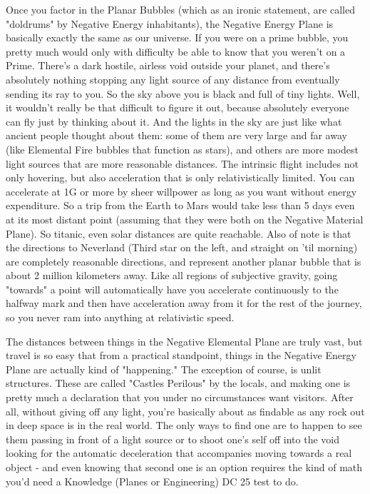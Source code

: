Once you factor in the Planar Bubbles (which as an ironic statement, are called "doldrums" by Negative Energy inhabitants), the Negative Energy Plane is basically exactly the same as our universe. If you were on a prime bubble, you pretty much would only with difficulty be able to know that you weren't on a Prime. There's a dark hostile, airless void outside your planet, and there's absolutely nothing stopping any light source of any distance from eventually sending its ray to you. So the sky above you is black and full of tiny lights. Well, it wouldn't really be that difficult to figure it out, because absolutely everyone can fly just by thinking about it. And the lights in the sky are just like what ancient people thought about them: some of them are very large and far away (like Elemental Fire bubbles that function as stars), and others are more modest light sources that are more reasonable distances. The intrinsic flight includes not only hovering, but also acceleration that is only relativistically limited. You can accelerate at 1G or more by sheer willpower as long as you want without energy expenditure. So a trip from the Earth to Mars would take less than 5 days even at its most distant point (assuming that they were both on the Negative Material Plane). So titanic, even solar distances are quite reachable. Also of note is that the directions to Neverland (Third star on the left, and straight on 'til morning) are completely reasonable directions, and represent another planar bubble that is about 2 million kilometers away. Like all regions of subjective gravity, going "towards" a point will automatically have you accelerate continuously to the halfway mark and then have acceleration away from it for the rest of the journey, so you never ram into anything at relativistic speed.

The distances between things in the Negative Elemental Plane are truly vast, but travel is so easy that from a practical standpoint, things in the Negative Energy Plane are actually kind of "happening." The exception of course, is unlit structures. These are called "Castles Perilous" by the locals, and making one is pretty much a declaration that you under no circumstances want visitors. After all, without giving off any light, you're basically about as findable as any rock out in deep space is in the real world. The only ways to find one are to happen to see them passing in front of a light source or to shoot one's self off into the void looking for the automatic deceleration that accompanies moving towards a real object - and even knowing that second one is an option requires the kind of math you'd need a Knowledge (Planes or Engineering) DC 25 test to do.

